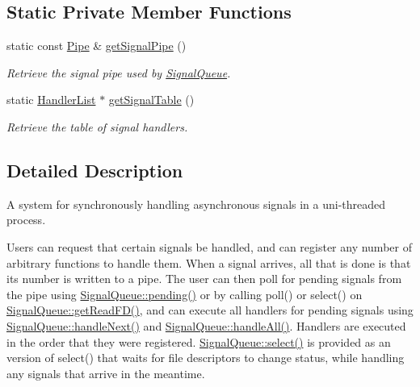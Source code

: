 \subsection*{\-Static \-Private \-Member \-Functions}
\begin{DoxyCompactItemize}
\item 
static const \hyperlink{structLibWheel_1_1SignalQueue_1_1Pipe}{\-Pipe} \& \hyperlink{classLibWheel_1_1SignalQueue_a522c461293731cec36208aa3bafe39c7}{get\-Signal\-Pipe} ()
\begin{DoxyCompactList}\small\item\em \-Retrieve the signal pipe used by \hyperlink{classLibWheel_1_1SignalQueue}{\-Signal\-Queue}. \end{DoxyCompactList}\item 
static \hyperlink{classLibWheel_1_1SignalQueue_a4bfc25c5e467e668c89ee0b0ceaa7591}{\-Handler\-List} $\ast$ \hyperlink{classLibWheel_1_1SignalQueue_a0e04644ce369cc519197043735986f9c}{get\-Signal\-Table} ()
\begin{DoxyCompactList}\small\item\em \-Retrieve the table of signal handlers. \end{DoxyCompactList}\end{DoxyCompactItemize}


\subsection{\-Detailed \-Description}
\-A system for synchronously handling asynchronous signals in a uni-\/threaded process. 

\-Users can request that certain signals be handled, and can register any number of arbitrary functions to handle them. \-When a signal arrives, all that is done is that its number is written to a pipe. \-The user can then poll for pending signals from the pipe using \hyperlink{classLibWheel_1_1SignalQueue_afd382f0a75d89bb0b6a22d9899c4435e}{\-Signal\-Queue\-::pending()} or by calling {\ttfamily poll()} or {\ttfamily select}() on \hyperlink{classLibWheel_1_1SignalQueue_a36582b3985b30c6620ed3476b97e8538}{\-Signal\-Queue\-::get\-Read\-F\-D()}, and can execute all handlers for pending signals using \hyperlink{classLibWheel_1_1SignalQueue_a991ba21066232f0db7be5f21e39edc41}{\-Signal\-Queue\-::handle\-Next()} and \hyperlink{classLibWheel_1_1SignalQueue_ad308bc4818a9d864bc0eb7b4dd1490ae}{\-Signal\-Queue\-::handle\-All()}. \-Handlers are executed in the order that they were registered. \hyperlink{classLibWheel_1_1SignalQueue_a8ba3b23aab26d744bcc2bffcc6598921}{\-Signal\-Queue\-::select()} is provided as an version of {\ttfamily select}() that waits for file descriptors to change status, while handling any signals that arrive in the meantime.


